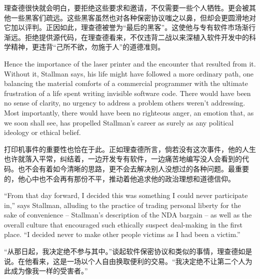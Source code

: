 \ifdefined\chs
理查德很快就会明白，要拒绝这些要求和邀请，不仅需要一些个人牺牲。更会被其他一些黑客们疏远。这些黑客虽然也对各种保密协议嗤之以鼻，但却会更圆滑地对它加以评判。正因如此，理查德被誉为“最后的黑客”。这使他与专有软件市场渐行渐远。拒绝提供源代码，在理查德看来，不仅违背二战以来深植入软件开发中的科学精神，更违背“己所不欲，勿施于人”的道德准则。
\fi

\ifdefined\eng
Hence the importance of the laser printer and the encounter that resulted from it. Without it, Stallman says, his life might have followed a more ordinary path, one balancing the material comforts of a commercial programmer with the ultimate frustration of a life spent writing invisible software code. There would have been no sense of clarity, no urgency to address a problem others weren't addressing. Most importantly, there would have been no righteous anger, an emotion that, as we soon shall see, has propelled Stallman's career as surely as any political ideology or ethical belief.
\fi

\ifdefined\chs
打印机事件的重要性也恰在于此。正如理查德所言，倘若没有这次事件，他的人生也许就落入平常，纠结着，一边开发专有软件，一边痛苦地编写没人会看到的代码。也不会有着如今清晰的思路，更不会去解决别人没想过的各种问题。最重要的，他心中也不会再有那份不平，推动着他追求他的政治理想和道德信仰。
\fi

\ifdefined\eng
``From that day forward, I decided this was something I could never participate in,'' says Stallman, alluding to the practice of trading personal liberty for the sake of convenience -- Stallman's description of the NDA bargain -- as well as the overall culture that encouraged such ethically suspect deal-making in the first place. ``I decided never to make other people victims as I had been a victim.''
\fi

\ifdefined\chs
“从那日起，我决定绝不参与其中。”谈起软件保密协议和类似的事情，理查德如是说。在他看来，这是一场以个人自由换取便利的交易。“我决定绝不让第二个人为此成为像我一样的受害者。”
\fi

\theendnotes
\setcounter{endnote}{0}
